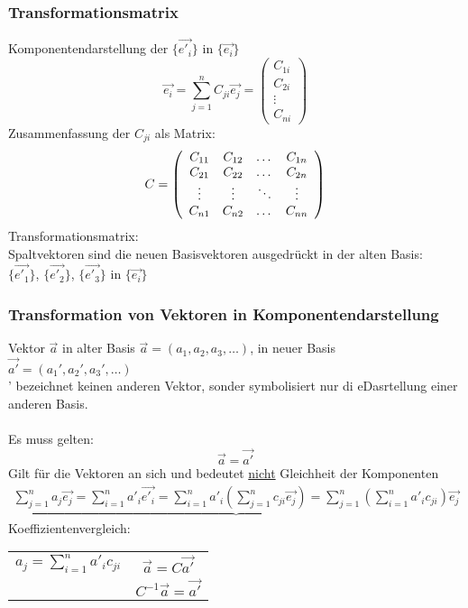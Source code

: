 \documentclass{article}
\begin{document}
\subsubsection{Transformationsmatrix}
Komponentendarstellung der $\{\vec{e'_i}\}$ in $\{ \vec{e_i} \}$
\begin{equation*}
    \vec{e_i} = \sum_{j=1}^{n}C_{ji}\vec{e_j}=\left(\begin{array}{c}C_{1i}\\C_{2i}\\\vdots\\C_{ni}\end{array}\right)
\end{equation*}
Zusammenfassung der $C_{ji}$ als Matrix:
\begin{equation*}
    C = \left(\begin{array}{c c c c}
        C_{11}&C_{12}&\dots&C_{1n}\\
        C_{21}&C_{22}&\dots&C_{2n}\\
        \vdots&\vdots&\ddots&\vdots\\
        C_{n1}&C_{n2}&\dots&C_{nn}\\
    \end{array}\right)
\end{equation*}
Transformationsmatrix:\\
Spaltvektoren sind die neuen Basisvektoren ausgedrückt in der alten Basis:\\
$\{\vec{e'_1}\}$, $\{\vec{e'_2}\}$, $\{\vec{e'_3}\}$ in $\{\vec{e_i}\}$

\subsubsection{Transformation von Vektoren in Komponentendarstellung}
Vektor $\vec{a}$ in alter Basis $\vec{a} = (a_1,a_2,a_3,\dots)$, in neuer Basis $\vec{a'} = (a_1',a_2',a_3',\dots)$\\
' bezeichnet keinen anderen Vektor, sonder symbolisiert nur di eDasrtellung einer anderen Basis.\\\\
Es muss gelten:
\begin{equation*}
    \vec{a} = \vec{a'}
\end{equation*}
Gilt für die Vektoren an sich und bedeutet \underline{nicht} Gleichheit der Komponenten\\
\begin{eqnarray*}
    \underbrace{\sum_{j=1}^{n} a_j\vec{e_j} = \sum_{i=1}^{n}a'_i\vec{e'_i} = \sum_{i=1}^{n} a'_i \left(\sum_{j=1}^{n} c_{ji}\vec{e_j}\right)=\sum_{j=1}^{n}\left(\sum_{i=1}^{n} a'_ic_{ji}\right)\vec{e_j}}
\end{eqnarray*}
Koeffizientenvergleich:
\begin{center}
    \begin{tabular}{c c}
        $a_j=\sum_{i=1}^{n}a'_ic_{ji}$&$\vec{a}=C\vec{a'}$\\
        &$C^{-1}\vec{a} =\vec{a'}$
    \end{tabular}
\end{center}
\end{document}
